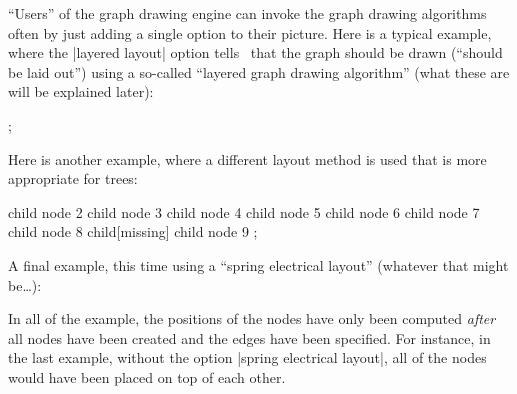 ``Users'' of the graph drawing engine can invoke the graph drawing algorithms
often by just adding a single option to their picture. Here is a typical
example, where the |layered layout| option tells \tikzname\ that the graph
should be drawn (``should be laid out'') using a so-called ``layered graph
drawing algorithm'' (what these are will be explained later):
%
\begin{codeexample}[preamble={\usetikzlibrary{arrows.meta,graphs,graphdrawing}
\usegdlibrary{layered}}]
\tikz [>={Stealth[round,sep]}]
  ;
\end{codeexample}
%
Here is another example, where a different layout method is used that is more
appropriate for trees:
%
\begin{codeexample}[preamble={\usetikzlibrary{graphdrawing}
\usegdlibrary{trees}}]
\tikz [grow'=up, binary tree layout, nodes={circle,draw}]
  child { node {2}
    child { node {3} }
    child { node {4}
      child { node {5} }
      child { node {6} }
    }
  }
  child { node {7}
    child { node {8}
      child[missing]
      child { node {9} }
    }
  };
\end{codeexample}
%
A final example, this time using a ``spring electrical layout'' (whatever that
might be\dots):
%
\begin{codeexample}[
    preamble={\usetikzlibrary{decorations.pathmorphing,graphdrawing}
\usegdlibrary{force}}]
\end{codeexample}
%
In all of the example, the positions of the nodes have only been computed
\emph{after} all nodes have been created and the edges have been specified. For
instance, in the last example, without the option |spring electrical layout|,
all of the nodes would have been placed on top of each other.


